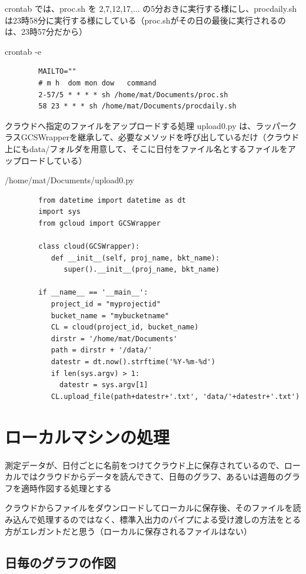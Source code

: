 \documentclass[12pt,a4paper,uplatex]{jsbook}
\begin{document}
crontab では、proc.sh を 2,7,12,17,... の5分おきに実行する様にし、procdaily.sh は23時58分に実行する様にしている（proc.shがその日の最後に実行されるのは、23時57分だから）

\begin{itembox}[l]{crontab -e}
	\begin{verbatim}
		MAILTO=""
		# m h  dom mon dow   command
		2-57/5 * * * * sh /home/mat/Documents/proc.sh
		58 23 * * * sh /home/mat/Documents/procdaily.sh
	\end{verbatim}	
\end{itembox}

クラウドへ指定のファイルをアップロードする処理 upload0.py は、ラッパークラスGCSWrapperを継承して、必要なメソッドを呼び出しているだけ（クラウド上にもdata/フォルダを用意して、そこに日付をファイル名とするファイルをアップロードしている）

\begin{itembox}[l]{/home/mat/Documents/upload0.py}
	\begin{verbatim}
		from datetime import datetime as dt
		import sys
		from gcloud import GCSWrapper
		
		class cloud(GCSWrapper):
		   def __init__(self, proj_name, bkt_name):
		      super().__init__(proj_name, bkt_name)
		
		if __name__ == '__main__':
		   project_id = "myprojectid"
		   bucket_name = "mybucketname"
		   CL = cloud(project_id, bucket_name)
		   dirstr = '/home/mat/Documents'
		   path = dirstr + '/data/'
		   datestr = dt.now().strftime('%Y-%m-%d')
		   if len(sys.argv) > 1:
		     datestr = sys.argv[1]
		   CL.upload_file(path+datestr+'.txt', 'data/'+datestr+'.txt')		
	\end{verbatim}	
\end{itembox}

\newpage

\section{ローカルマシンの処理}

測定データが、日付ごとに名前をつけてクラウド上に保存されているので、ローカルではクラウドからデータを読んできて、日毎のグラフ、あるいは週毎のグラフを適時作図する処理とする

クラウドからファイルをダウンロードしてローカルに保存後、そのファイルを読み込んで処理するのではなく、標準入出力のパイプによる受け渡しの方法をとる方がエレガントだと思う（ローカルに保存されるファイルはない）
\subsection{日毎のグラフの作図}
\end{document}
